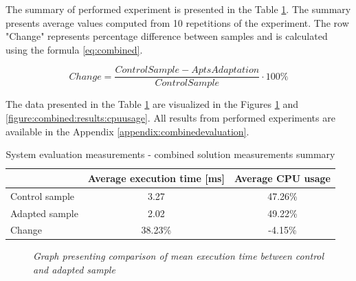 \documentclass[12pt,a4paper]{article}
\begin{document}
The summary of performed experiment is presented in the Table \ref{table:combined:results:summary}. The summary presents average values computed from 10 repetitions of the experiment. The row "Change" represents percentage difference between samples and is calculated using the formula \eqref{eq:combined}.

\begin{equation} \label{eq:combined}
Change = \frac{ControlSample - AptsAdaptation}{ControlSample}\cdot 100\%
\end{equation}

The data presented in the Table \ref{table:combined:results:summary} are visualized in the Figures \ref{figure:combined:results:executiontime} and \ref{figure:combined:results:cpuusage}. All results from performed experiments are available in the Appendix \ref{appendix:combinedevaluation}.

\begin{table}[ht]
\begin{center}
\begin{tabular}{l|c|c}
    & \textbf{Average execution time [ms]} & \textbf{Average CPU usage} \\ \hline
    Control	sample	  &3.27     & 47.26\% \\ 
    Adapted sample	  &2.02	    & 49.22\% \\ \hline
    Change		      &38.23\%	& -4.15\%
\end{tabular}
\end{center}
\caption{System evaluation measurements - combined solution measurements summary} \label{table:combined:results:summary}
\end{table}

\begin{figure}[!htb]
\centering
{}
\caption{\textit{Graph presenting comparison of mean execution time between control and adapted sample}} \label{figure:combined:results:executiontime}
\end{figure}
\end{document}
